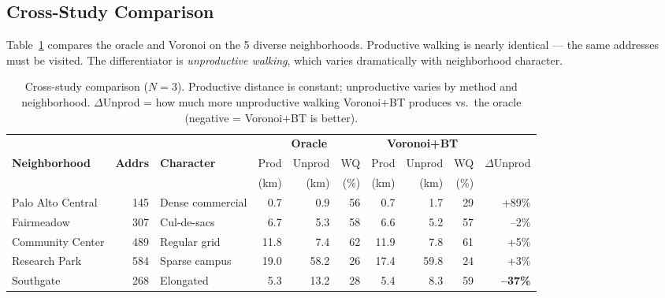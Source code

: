 \documentclass[conference]{IEEEtran}
\begin{document}
\subsection{Cross-Study Comparison}

Table~\ref{tab:comparison} compares the oracle and Voronoi on the 5 diverse neighborhoods. Productive walking is nearly identical --- the same addresses must be visited. The differentiator is \emph{unproductive walking}, which varies dramatically with neighborhood character.

\begin{table}[htbp]
\caption{Cross-study comparison ($N=3$). Productive distance is constant; unproductive varies by method and neighborhood. $\Delta$Unprod = how much more unproductive walking Voronoi+BT produces vs.\ the oracle (negative = Voronoi+BT is better).}
\label{tab:comparison}
\begin{center}
\begin{tabular}{l r l | r r r | r r r | r}
\toprule
& & & \multicolumn{3}{c|}{\textbf{Oracle}} & \multicolumn{3}{c|}{\textbf{Voronoi+BT}} & \\
\textbf{Neighborhood} & \textbf{Addrs} & \textbf{Character} & Prod & Unprod & WQ & Prod & Unprod & WQ & $\Delta$Unprod \\
& & & (km) & (km) & (\%) & (km) & (km) & (\%) & \\
\midrule
Palo Alto Central & 145 & Dense commercial   & 0.7 & 0.9 & 56 & 0.7 & 1.7 & 29 & +89\% \\
Fairmeadow        & 307 & Cul-de-sacs        & 6.7 & 5.3 & 58 & 6.6 & 5.2 & 57 & --2\%  \\
Community Center  & 489 & Regular grid       & 11.8& 7.4 & 62 & 11.9& 7.8 & 61 & +5\%  \\
Research Park     & 584 & Sparse campus      & 19.0& 58.2& 26 & 17.4& 59.8& 24 & +3\%  \\
Southgate         & 268 & Elongated          & 5.3 & 13.2& 28 & 5.4 & 8.3 & 59 & \textbf{--37\%} \\
\bottomrule
\end{tabular}
\end{center}
\end{table}
\end{document}
